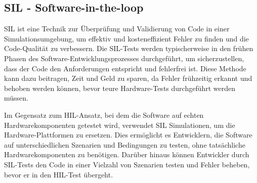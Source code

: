 \subsection{SIL - Software-in-the-loop}

\ac{SIL} ist eine Technik zur Überprüfung und Validierung von Code in einer Simulationsumgebung, um effektiv und kosteneffizient Fehler zu finden und die Code-Qualität zu verbessern. Die SIL-Tests werden typischerweise in den frühen Phasen des Software-Entwicklungsprozesses durchgeführt, um sicherzustellen, dass der Code den Anforderungen entspricht und fehlerfrei ist. Diese Methode kann dazu beitragen, Zeit und Geld zu sparen, da Fehler frühzeitig erkannt und behoben werden können, bevor teure Hardware-Tests durchgeführt werden müssen.

Im Gegensatz zum \ac{HIL}-Ansatz, bei dem die Software auf echten Hardwarekomponenten getestet wird, verwendet \ac{SIL} Simulationen, um die Hardware-Plattformen zu ersetzen. Dies ermöglicht es Entwicklern, die Software auf unterschiedlichen Szenarien und Bedingungen zu testen, ohne tatsächliche Hardwarekomponenten zu benötigen. Darüber hinaus können Entwickler durch \ac{SIL}-Tests den Code in einer Vielzahl von Szenarien testen und Fehler beheben, bevor er in den \ac{HIL}-Test übergeht. \cite[vgl.][]{SIL}